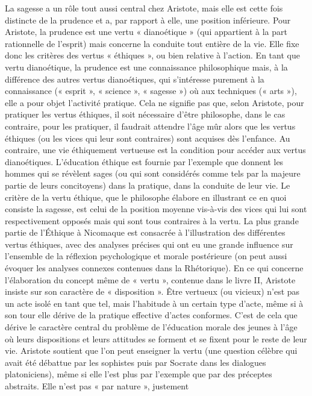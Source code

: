 La sagesse a un rôle tout aussi central
chez Aristote, mais elle est cette fois distincte
de la prudence et a, par rapport à
elle, une position inférieure. Pour Aristote,
la prudence est une vertu « dianoétique »
(qui appartient à la part rationnelle
de l'esprit) mais concerne la conduite tout
entière de la vie. Elle fixe donc les critères
des vertus « éthiques », ou bien relative à
l’action. En tant que vertu dianoétique, la
prudence est une connaissance philosophique
mais, à la différence des autres
vertus dianoétiques, qui s'intéresse purement
à la connaissance (« esprit », « science »,
« sagesse ») où aux techniques
(« arts »), elle a pour objet l’activité pratique.
%
Cela ne signifie pas que, selon Aristote,
pour pratiquer les vertus éthiques, il
soit nécessaire d’être philosophe, dans le
cas contraire, pour les pratiquer, il faudrait
attendre l’âge mûr alors que les vertus
éthiques (ou les vices qui leur sont
contraires) sont acquises dès l’enfance.
Au contraire, une vie éthiquement vertueuse
est la condition pour accéder aux
vertus dianoétiques. L'éducation éthique
est fournie par l'exemple que donnent les
hommes qui se révèlent sages (ou qui sont
considérés comme tels par la majeure partie
de leurs concitoyens) dans la pratique,
dans la conduite de leur vie. Le critère de
la vertu éthique, que le philosophe élabore
en illustrant ce en quoi consiste la
sagesse, est celui de la position moyenne
vis-à-vis des vices qui lui sont respectivement
opposés mais qui sont tous
contraires à la vertu. La plus grande partie
de l’Éthique à Nicomaque est consacrée
à l'illustration des différentes vertus
éthiques, avec des analyses précises qui
ont eu une grande influence sur l’ensemble
de la réflexion psychologique et
morale postérieure (on peut aussi évoquer
les analyses connexes contenues
dans la Rhétorique). En ce qui concerne
l'élaboration du concept même de « vertu »,
contenue dans le livre II, Aristote
insiste sur son caractère de « disposition ».
Être vertueux (ou vicieux) n’est
pas un acte isolé en tant que tel, mais l’habitude
à un certain type d’acte, même si à
son tour elle dérive de la pratique effective
d’actes conformes. C’est de cela que
dérive le caractère central du problème
de l’éducation morale des jeunes à l’âge
où leurs dispositions et leurs attitudes se
forment et se fixent pour le reste de leur
vie. Aristote soutient que l’on peut enseigner
la vertu (une question célèbre qui
avait été débattue par les sophistes puis
par Socrate dans les dialogues platoniciens),
même si elle l’est plus par
l’exemple que par des préceptes abstraits.
Elle n’est pas « par nature », justement
